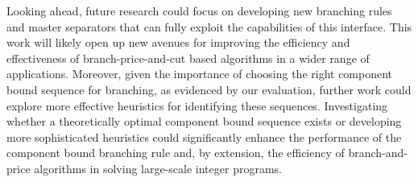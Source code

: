 Looking ahead, future research could focus on developing new branching rules and master separators that can fully exploit the capabilities of this interface. This work will likely open up new avenues for improving the efficiency and effectiveness of branch-price-and-cut based algorithms in a wider range of applications. Moreover, given the importance of choosing the right component bound sequence for branching, as evidenced by our evaluation, further work could explore more effective heuristics for identifying these sequences. Investigating whether a theoretically optimal component bound sequence exists or developing more sophisticated heuristics could significantly enhance the performance of the component bound branching rule and, by extension, the efficiency of branch-and-price algorithms in solving large-scale integer programs.
